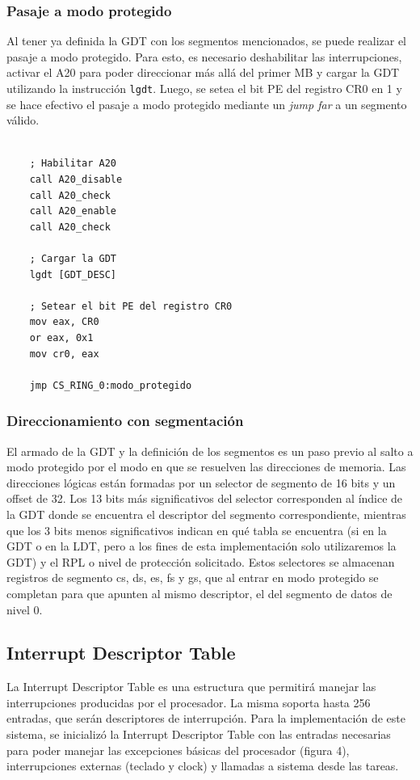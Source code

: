 \documentclass[a4paper]{article}
\newenvironment{codesnippet}{%
	\begin{Sbox}\begin{minipage}{\textwidth}\sffamily\small}%
	{\end{minipage}\end{Sbox}%
		\begin{center}%
		\vspace{-0.4cm}\colorbox{litegrey}{\TheSbox}\end{center}\vspace{0.3cm}}
\begin{document}
\newpage

\subsubsection{Pasaje a modo protegido}
Al tener ya definida la GDT con los segmentos mencionados, se puede realizar el pasaje a modo protegido. Para esto, es necesario deshabilitar las interrupciones, activar el A20 para poder direccionar más allá del primer MB y cargar la GDT utilizando la instrucción {\tt lgdt}. Luego, se setea el bit PE del registro CR0 en 1 y se hace efectivo el pasaje a modo protegido mediante un \textit{jump far} a un segmento válido. 

\begin{codesnippet}
\begin{verbatim}

    ; Habilitar A20
    call A20_disable
    call A20_check
    call A20_enable
    call A20_check
    
    ; Cargar la GDT
    lgdt [GDT_DESC]

    ; Setear el bit PE del registro CR0
    mov eax, CR0
    or eax, 0x1
    mov cr0, eax

    jmp CS_RING_0:modo_protegido

\end{verbatim}
\end{codesnippet}

\subsubsection{Direccionamiento con segmentación}
El armado de la GDT y la definición de los segmentos es un paso previo al salto a modo protegido por el modo en que se resuelven las direcciones de memoria. Las direcciones lógicas están formadas por un selector de segmento de 16 bits y un offset de 32. Los 13 bits más significativos del selector corresponden al índice de la GDT donde se encuentra el descriptor del segmento correspondiente, mientras que los 3 bits menos significativos indican en qué tabla se encuentra (si en la GDT o en la LDT, pero a los fines de esta implementación solo utilizaremos la GDT) y el RPL o nivel de protección solicitado. Estos selectores se almacenan registros de segmento cs, ds, es, fs y gs, que al entrar en modo protegido se completan para que apunten al mismo descriptor, el del segmento de datos de nivel 0.

\subsection{Interrupt Descriptor Table}
La Interrupt Descriptor Table es una estructura que permitirá manejar las interrupciones producidas por el procesador. La misma soporta hasta 256 entradas, que serán descriptores de interrupción. Para la implementación de este sistema, se inicializó la Interrupt Descriptor Table con las entradas necesarias para poder manejar las excepciones básicas del procesador (figura 4), interrupciones externas (teclado y clock) y llamadas a sistema desde las tareas.
\end{document}

